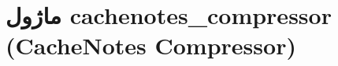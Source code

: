 \section{ماژول cachenotes\_compressor (CacheNotes Compressor)}
\label{sec:module_cachenotes_compressor}
